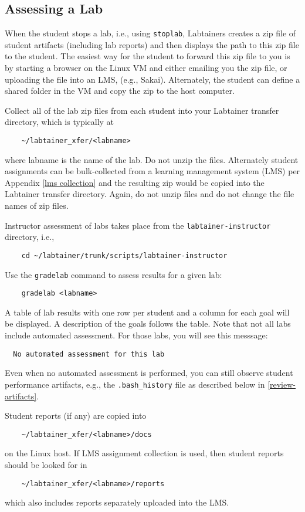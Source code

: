 \documentclass[12pt]{article}
\begin{document}
\subsection{Assessing a Lab}
When the student stops a lab, i.e., using {\tt stoplab}, Labtainers creates a zip file of
student artifacts (including lab reports) and then displays the path to this zip file to
the student.  The easiest way for the student to forward this zip file to you is by starting
a browser on the Linux VM and either emailing you the zip file, or uploading the file
into an LMS, (e.g., Sakai).  Alternately, the student can define a shared folder in the VM
and copy the zip to the host computer.

Collect all of the lab zip files from each student into your Labtainer transfer directory, which
is typically at
\begin{verbatim}
    ~/labtainer_xfer/<labname>
\end{verbatim}
\noindent where labname is the name of the lab.  Do not unzip the files.  Alternately student
assignments can be bulk-collected from a learning management system (LMS) per Appendix \ref{lms collection}
and the resulting zip  would be copied into the
Labtainer transfer directory.  Again, do not unzip files and do not change the file names of zip files.

Instructor assessment of labs takes place from the {\tt labtainer-instructor} directory, i.e.,
\begin{verbatim}
    cd ~/labtainer/trunk/scripts/labtainer-instructor
\end{verbatim}

\noindent Use the {\tt gradelab} command to assess results for a given lab:
\begin{verbatim}
    gradelab <labname>
\end{verbatim}
\noindent A table of lab results with one row per student and
a column for each goal will be displayed.  A description of the goals follows the table.
Note that not all labs include automated assessment.  For those labs, you will see this
messsage:
\begin{verbatim}
  No automated assessment for this lab
\end{verbatim}
\noindent Even when no automated assessment is performed, you can still observe student performance
artifacts, e.g., the {\tt .bash\_history} file as described below in \ref{review-artifacts}.

Student reports (if any) are  copied into 
\begin{verbatim}
    ~/labtainer_xfer/<labname>/docs
\end{verbatim}
\noindent on the Linux host.  If LMS assignment collection is used, then student reports should
be looked for in 
\begin{verbatim}
    ~/labtainer_xfer/<labname>/reports
\end{verbatim}
\noindent which also includes reports separately uploaded into the LMS.
\end{document}
